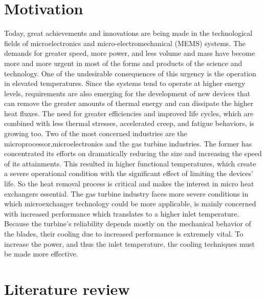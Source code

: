\section{Motivation}    %

 Today, great achievements and innovations are being made in the
 technological fields of microelectronics and micro-electromechanical (MEMS)
 systems. The demands for greater speed, more power, and less volume and
 mass have become more and more urgent in most of the forms and products of
 the science and technology. One of the undesirable consequences of this
 urgency is the operation in elevated temperatures. Since the systems tend to
 operate at higher energy levels, requirements are also emerging for the
 development of new devices that can remove the greater amounts of thermal
 energy and can dissipate the higher heat fluxes. The need for greater efficiencies
 and improved life cycles, which are combined with less thermal stresses,
 accelerated creep, and fatigue behaviors, is growing too.
 Two of the most concerned industries are the microprocessor,microelectronics
 and the gas turbine industries. The former has concentrated its
 efforts on dramatically reducing the size and increasing the speed of its
 attainments. This resulted in higher functional temperatures, which create a
 severe operational condition with the significant effect of limiting the devices’ life.
 So the heat removal process is critical and makes the interest in micro heat
 exchangers essential.
 The gas turbine industry faces more severe conditions in which microexchanger
 technology could be more applicable, is mainly concerned with
 increased performance which translates to a higher inlet temperature. Because
 the turbine’s reliability depends mostly on the mechanical behavior of the blades,
 their cooling due to increased performance is extremely vital. To increase the
 power, and thus the inlet temperature, the cooling techniques must be made
 more effective.




\section{Literature review}

